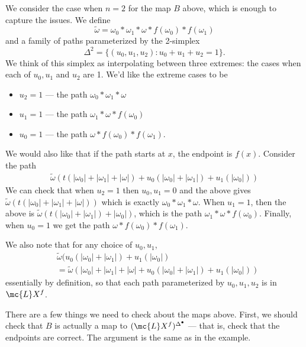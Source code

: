 \documentclass[11pt]{amsart}
\begin{document}
\begin{example}
  We consider the case when $n = 2$ for the map $B$ above, which is enough to capture the issues. We define
  \[
  \widetilde{\omega} = \omega_0 \ast \omega_1 \ast \omega \ast f(\omega_0) \ast f(\omega_1)
  \]
  and  a family of paths parameterized by the 2-simplex \[\Delta^2 = \{(u_0, u_1, u_2) : u_0 + u_1 + u_2 = 1\}.\] 
We think of this simplex as interpolating between three extremes: the cases when each of $u_0, u_1$ and $u_2$ are 1. We'd like the extreme cases to be
  \begin{itemize}
  \item $u_2 = 1$ --- the path $\omega_0 \ast \omega_1 \ast \omega$
  \item $u_1 = 1$ --- the path $\omega_1 \ast \omega \ast f(\omega_0)$
  \item $u_0 = 1$ --- the path $\omega \ast f(\omega_0) \ast f(\omega_1)$. 
  \end{itemize}
  We would also like that if the path starts at $x$, the endpoint is $f(x)$. Consider the path 
  \begin{align*}
    \widetilde{\omega} (t(|\omega_0| + |\omega_1| + |\omega|) + u_0 (|\omega_0| + |\omega_1|) + u_1 (|\omega_0|))
  \end{align*}
  We can check that when $u_2 = 1$ then $u_0, u_1 = 0$ and the above gives $\widetilde{\omega}(t(|\omega_0| + |\omega_1|+|\omega|))$ which is exactly $\omega_0 \ast \omega_1 \ast \omega$. When $u_1 = 1$, then the above is $\widetilde{\omega}(t(|\omega_0| + |\omega_1|) + |\omega_0|)$, which is the path $\omega_1 \ast \omega \ast f(\omega_0)$. Finally, when $u_0 = 1$ we get the path $\omega \ast f(\omega_0) \ast f(\omega_1)$.

  We also note that for any choice of $u_0, u_1$, 
  \begin{align*}
    &\widetilde{\omega}(u_0 (|\omega_0| + |\omega_1|) + u_1 (|\omega_0|)\\
    &= \widetilde{\omega} (|\omega_0| + |\omega_1| + |\omega| + u_0 (|\omega_0| + |\omega_1|) + u_1 (|\omega_0|))
  \end{align*}
  essentially by definition, so that each path parameterized by $u_0, u_1, u_2$ is in $\mc{L} X^f$. 
\end{example}

There are a few things we need to check about the maps above. First, we should check that $B$ is actually a map to $(\mc{L} X^f)^{\Delta^\bullet}$ --- that is, check that the endpoints are correct. The argument is the same as in the example. 
\end{document}
